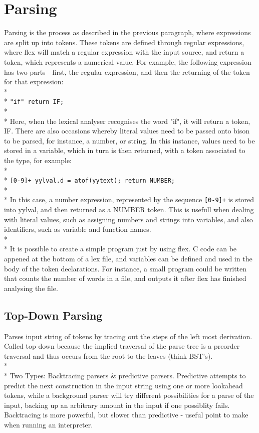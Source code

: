 \documentclass[12pt]{report}
\begin{document}
\section{Parsing}\label{sec:parsing}
Parsing is the process as described in the previous paragraph, where expressions are split up into tokens.  These tokens are defined through regular expressions, where flex will match a regular expression with the input source, and return a token, which represents a numerical value.
For example, the following expression has two parts - first, the regular expression, and then the returning of the token for that expression:
\\*
\\*
\texttt{"if" \quad\quad return IF;}
\\*
\\*
Here, when the lexical analyser recognises the word "if", it will return a token, IF.  There are also occasions whereby literal values need to be passed onto bison to be parsed, for instance, a number, or string.  In this instance, values need to be stored in a variable, which in turn is then returned, with a token associated to the type, for example:
\\*
\\*
\texttt{[0-9]+ \quad\quad yylval.d = atof(yytext); return NUMBER;}
\\*
\\*
In this case, a number expression, represented by the sequence \texttt{[0-9]+} is stored into yylval, and then returned as a NUMBER token.  This is usefull when dealing with 
literal values, such as assigning numbers and strings into variables, and also identifiers, such as variable and function names.
\\*
\\*
It is possible to create a simple program just by using flex.  C code can be appened at the bottom of a lex file, and variables can be defined and used in the body of the token declarations.  For instance, a small program could be written that counts the number of words in a file, and outputs it after flex has finished analysing the file.

\subsection{Top-Down Parsing}\label{subsec:top_down_parsing}
Parses input string of tokens by tracing out the steps of the left most derivation.  Called top down because the implied traversal of the parse tree is a preorder traversal and thus occurs from the root to the leaves (think BST's).
\\*
\\*
Two Types: Backtracing parsers \& predictive parsers.
Predictive attempts to predict the next construction in the input string using one or more lookahead tokens, while a background parser will try different possibilities for a parse of the input, backing up an arbitrary amount in the input if one possiblity fails.  Backtracing is more powerful, but slower than predictive - useful point to make when running an interpreter.\citep{compilerconstruction97}
\end{document}
